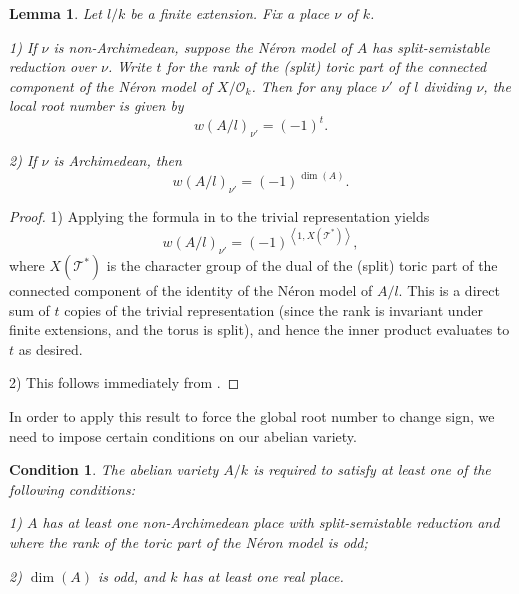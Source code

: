 \documentclass[a4paper,12pt]{amsart}
\newtheorem{lemma}[definition]{Lemma}
\newtheorem{condition}[definition]{Condition}
\begin{document}
\begin{lemma}
Let ${l}/k$ be a finite extension. Fix a place $\nu$ of $k$. 

1) If $\nu$ is non-Archimedean, suppose the N\'eron model of $A$ has split-semistable reduction over $\nu$.  Write $t$ for the rank of the (split) toric part of the connected component of the N\'eron model of $X/\mathcal{O}_{k}$. Then for any place $\nu'$ of ${l}$ dividing $\nu$, the local root number is given by
\begin{equation}
w(A/{l})_{\nu'} = (-1)^{t}. 
\end{equation}

2) If $\nu$ is Archimedean, then 
\begin{equation}
w(A/{l})_{\nu'} = (-1)^{\dim(A)}. 
\end{equation}
\end{lemma}
\begin{proof}
1) Applying the formula in \cite[Proposition 3.23]{dokchitser2009regulator} to the trivial representation yields
\begin{equation}
w(A/{l})_{\nu'} = (-1)^{{\left<{1, X(\mathcal{T}^{*})}\right>}}, 
\end{equation}
where $X(\mathcal{T}^{*})$ is the character group of the dual of the (split) toric part of the connected component of the identity of the N\'eron model of $A/{l}$. This is a direct sum of $t$ copies of the trivial representation (since the rank is invariant under finite extensions, and the torus is split), and hence the inner product evaluates to $t$ as desired. 

2) This follows immediately from \cite[Lemma 3.1.1, p31]{sabitova2005root}. 
\end{proof}

In order to apply this result to force the global root number to change sign, we need to impose certain conditions on our abelian variety. 
\begin{condition}\label{conditions_on_A}
The abelian variety $A/k$ is required to satisfy at least one of the following conditions:

1) $A$ has at least one non-Archimedean place with split-semistable reduction and where the rank of the toric part of the N\'eron model is odd;

2) $\dim(A)$ is odd, and $k$ has at least one real place. 
\end{condition}
\end{document}
